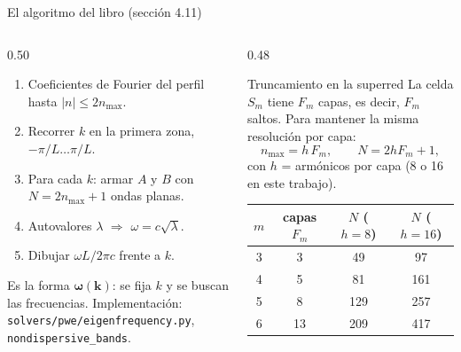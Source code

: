 \documentclass[aspectratio=169,10pt]{beamer}
\begin{document}
\begin{frame}{El algoritmo del libro (sección 4.11)}
  \begin{columns}[T]
    \begin{column}{0.50\textwidth}
      \begin{enumerate}
        \item Coeficientes de Fourier del perfil hasta $|n|\le2n_{\max}$.
        \item Recorrer $k$ en la primera zona, $-\pi/L\dots\pi/L$.
        \item Para cada $k$: armar $A$ y $B$ con $N=2n_{\max}+1$ ondas planas.
        \item Autovalores $\lambda$ $\Rightarrow$ $\omega=c\sqrt{\lambda}$.
        \item Dibujar $\omega L/2\pi c$ frente a $k$.
      \end{enumerate}
      \vspace{0.4em}
      \small Es la forma $\boldsymbol{\omega(k)}$: se fija $k$ y se buscan las frecuencias.
      Implementación: \texttt{solvers/pwe/eigenfrequency.py}, \texttt{nondispersive\_bands}.
    \end{column}
    \begin{column}{0.48\textwidth}
      \begin{alertblock}{Truncamiento en la superred}
        \small
        La celda $S_m$ tiene $F_m$ capas, es decir, $F_m$ saltos. Para mantener la misma resolución por capa:
        \[n_{\max}=h\,F_m,\qquad N=2hF_m+1,\]
        con $h$ = armónicos por capa (8 o 16 en este trabajo).
      \end{alertblock}
      \footnotesize
      \begin{center}
        \begin{tabular}{cccc}
          \toprule
          $m$ & capas $F_m$ & $N$ ($h=8$) & $N$ ($h=16$) \\
          \midrule
          3 & 3 & 49 & 97 \\
          4 & 5 & 81 & 161 \\
          5 & 8 & 129 & 257 \\
          6 & 13 & 209 & 417 \\
          \bottomrule
        \end{tabular}
      \end{center}
    \end{column}
  \end{columns}
\end{frame}

\end{document}
